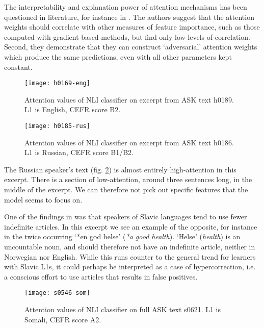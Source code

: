 The interpretability and explanation power of attention mechanisms has been
questioned in literature, for instance in \textcite{attentionexplanation}.
The authors suggest that the attention weights should correlate with other
measures of feature importance, such as those computed with gradient-based
methods, but find only low levels of correlation. Second, they demonstrate
that they can construct `adversarial' attention weights which produce the
same predictions, even with all other parameters kept constant.

\begin{figure}
  \centering
  \texttt{[image: h0169-eng]}
  \caption[Attention in a text by an English speaker]{
    Attention values of NLI classifier on excerpt from ASK text h0189. L1 is
    English, CEFR score B2.
  }
  \label{fig:eng-attention}
\end{figure}

\begin{figure}
  \centering
  \texttt{[image: h0185-rus]}
  \caption[Attention in a text by a Russian speaker]{
    Attention values of NLI classifier on excerpt from ASK text h0186. L1 is
    Russian, CEFR score B1/B2.
  }
  \label{fig:rus-attention}
\end{figure}

The Russian speaker's text (fig. \ref{fig:rus-attention}) is almost entirely
high-attention in this excerpt. There is a section of low-attention, around
three sentences long, in the middle of the excerpt. We can therefore not pick
out specific features that the model seems to focus on.

One of the findings in \textcite{pepper2012} was that speakers of Slavic
languages tend to use fewer indefinite articles. In this excerpt we see an
example of the opposite, for instance in the twice occurring `*en god helse'
(\emph{*a good health}). `Helse' (\emph{{health}}) is an uncountable noun,
and should therefore not have an indefinite article, neither in Norwegian nor
English. While this runs counter to the general trend for learners with
Slavic \acp{L1}, it could perhaps be interpreted as a case of
hypercorrection, i.e. a conscious effort to use articles that results in
false positives.

\begin{figure}
  \centering
  \texttt{[image: s0546-som]}
  \caption[Attention in a text by a Somali speaker]{
    Attention values of NLI classifier on full ASK text s0621. L1 is Somali,
    CEFR score A2.
  }
  \label{fig:som-attention}
\end{figure}

